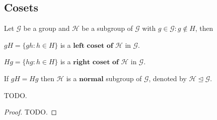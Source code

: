 
\subsection{Cosets} %
\label{subsec:cosets}



Let $\mathcal{G}$ be a group and $\mathcal{H}$ be a subgroup of $\mathcal{G}$ with $g \in \mathcal{G} : g \notin H$, then
\begin{defn}
	$gH = \{gh : h \in H\}$ is a $\textbf{left coset of } \mathcal{H}$ in $\mathcal{G}$.
\end{defn}

\begin{defn}
	$Hg = \{hg : h \in H\}$ is a $\textbf{right coset of } \mathcal{H}$ in $\mathcal{G}$.
\end{defn}

\begin{defn}
	If $gH = Hg$ then $\mathcal{H}$ is a $\textbf{normal}$ subgroup of $\mathcal{G}$, denoted by $\mathcal{H} \unlhd \mathcal{G}$.
\end{defn}

\begin{thm}
	TODO.
\end{thm}

\begin{proof}
	TODO.
\end{proof}
